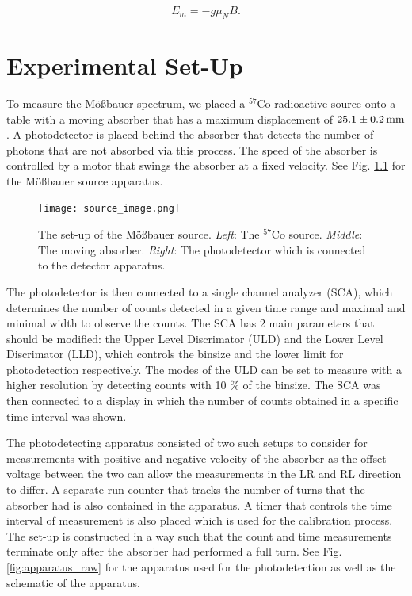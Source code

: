 \documentclass[a4paper]{report}
\numberwithin{equation}{section}
\begin{document}
\begin{equation}
		E_{m} = - g \mu _{N} B.
        \label{eq:hyperfine_en}
\end{equation}


\chapter{Experimental Set-Up} \label{sec:experiment}

To measure the M\"o{\ss}bauer spectrum, we placed a $^{57}$Co radioactive source onto a table with a moving absorber 
that has a maximum displacement of $\SI[]{25.1 \pm 0.2}[]{\milli\metre}$.  A photodetector is placed 
behind the absorber that detects the number of photons that are not absorbed via this process. The speed of the 
absorber is controlled by a motor that swings the absorber at a fixed velocity. See Fig. \ref{fig:apparatus_source}
for the M\"o{\ss}bauer source apparatus. \par 

\begin{figure}[htb!]
	\centering
	\texttt{[image: source\_image.png]}

	\caption{The set-up of the M\"o{\ss}bauer source. \textit{Left}: The $^{57}$Co source. \textit{Middle}: 
	The moving absorber. \textit{Right}: The photodetector which is connected to the detector apparatus.
	}
	\label{fig:apparatus_source}
\end{figure}

The photodetector is then connected to a single channel analyzer (SCA), which determines the number of counts detected
in a given time range and maximal and minimal width to observe the counts. The SCA has 2 main parameters that should be modified:
the Upper Level Discrimator (ULD) and the Lower Level Discrimator (LLD), which controls the binsize and the lower limit for 
photodetection respectively. The modes of the ULD can be set to measure with a higher resolution by detecting counts with 
10 $\%$ of the binsize. The SCA was then connected to a display in which the number of counts obtained in a specific time 
interval was shown. \par 

The photodetecting apparatus consisted of two such setups to consider for measurements with positive and negative velocity 
of the absorber as the offset voltage between the two can allow the measurements in the LR and RL direction to differ.
A separate run counter that tracks the number of turns that the absorber had is also contained in the apparatus. A timer 
that controls the time interval of measurement is also placed which is used for the calibration process. The set-up is 
constructed in a way such that the count and time measurements terminate only after the absorber had performed a full turn. 
See Fig. \ref{fig:apparatus_raw} for the apparatus used for the photodetection as well as the schematic of the apparatus. \par 
\end{document}
